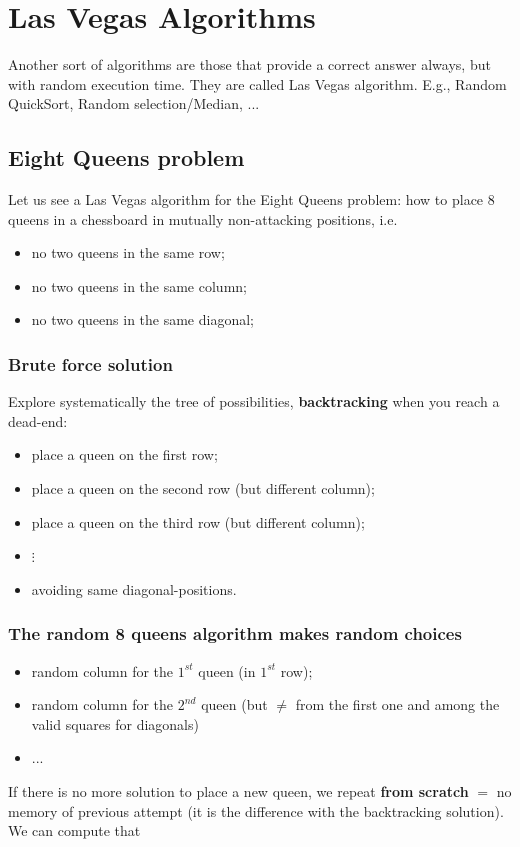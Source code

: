 \section{Las Vegas Algorithms}
Another sort of algorithms are those that provide a correct answer always, but with random execution time. They are called Las Vegas algorithm. E.g., Random QuickSort, Random selection/Median, ...

\subsection{Eight Queens problem}

Let us see a Las Vegas algorithm for the Eight Queens problem: how to place 8 queens in a chessboard in mutually non-attacking positions, i.e.
\begin{itemize}
	\item no two queens in the same row;
	\item no two queens in the same column;
	\item no two queens in the same diagonal;
\end{itemize}

\subsubsection{Brute force solution}
Explore systematically the tree of possibilities, \textbf{backtracking} when you reach a dead-end:
\begin{itemize}
	\item place a queen on the first row;
	\item place a queen on the second row (but different column);
	\item place a queen on the third row (but different column);
	\item $\vdots$
	\item avoiding same diagonal-positions.
\end{itemize}
\subsubsection{The random 8 queens algorithm makes random choices}
\begin{itemize}
	\item random column for the $1^{st}$ queen (in $1^{st}$ row);
	\item random column for the $2^{nd}$ queen (but $\neq$ from the first one and among the valid squares for diagonals)
	\item ...
\end{itemize}
If there is no more solution to place a new queen, we repeat \textbf{from scratch} $=$ no memory of previous attempt (it is the difference with the backtracking solution). We can compute that 


